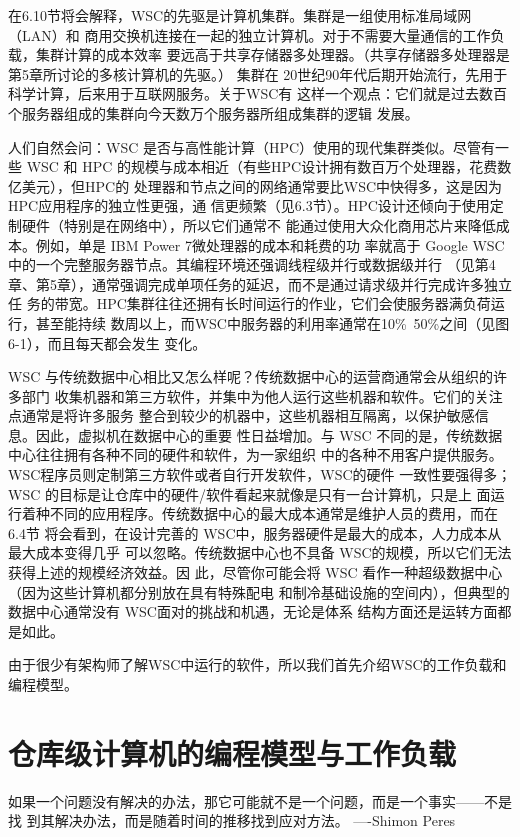 在6.10节将会解释，WSC的先驱是计算机集群。集群是一组使用标准局域网（LAN）和
商用交换机连接在一起的独立计算机。对于不需要大量通信的工作负载，集群计算的成本效率
要远高于共享存储器多处理器。（共享存储器多处理器是第5章所讨论的多核计算机的先驱。）
集群在 20世纪90年代后期开始流行，先用于科学计算，后来用于互联网服务。关于WSC有
这样一个观点：它们就是过去数百个服务器组成的集群向今天数万个服务器所组成集群的逻辑
发展。

人们自然会问：WSC 是否与高性能计算（HPC）使用的现代集群类似。尽管有一些 WSC
和 HPC 的规模与成本相近（有些HPC设计拥有数百万个处理器，花费数亿美元），但HPC的
处理器和节点之间的网络通常要比WSC中快得多，这是因为HPC应用程序的独立性更强，通
信更频繁（见6.3节）。HPC设计还倾向于使用定制硬件（特别是在网络中），所以它们通常不
能通过使用大众化商用芯片来降低成本。例如，单是 IBM Power 7微处理器的成本和耗费的功
率就高于 Google WSC中的一个完整服务器节点。其编程环境还强调线程级并行或数据级并行
（见第4章、第5章），通常强调完成单项任务的延迟，而不是通过请求级并行完成许多独立任
务的带宽。HPC集群往往还拥有长时间运行的作业，它们会使服务器满负荷运行，甚至能持续
数周以上，而WSC中服务器的利用率通常在10\%~50\%之间（见图6-1），而且每天都会发生
变化。

WSC 与传统数据中心相比又怎么样呢？传统数据中心的运营商通常会从组织的许多部门
收集机器和第三方软件，并集中为他人运行这些机器和软件。它们的关注点通常是将许多服务
整合到较少的机器中，这些机器相互隔离，以保护敏感信息。因此，虚拟机在数据中心的重要
性日益增加。与 WSC 不同的是，传统数据中心往往拥有各种不同的硬件和软件，为一家组织
中的各种不用客户提供服务。WSC程序员则定制第三方软件或者自行开发软件，WSC的硬件
一致性要强得多；WSC 的目标是让仓库中的硬件/软件看起来就像是只有一台计算机，只是上
面运行着种不同的应用程序。传统数据中心的最大成本通常是维护人员的费用，而在6.4节
将会看到，在设计完善的 WSC中，服务器硬件是最大的成本，人力成本从最大成本变得几乎
可以忽略。传统数据中心也不具备 WSC的规模，所以它们无法获得上述的规模经济效益。因
此，尽管你可能会将 WSC 看作一种超级数据中心（因为这些计算机都分别放在具有特殊配电
和制冷基础设施的空间内），但典型的数据中心通常没有 WSC面对的挑战和机遇，无论是体系
结构方面还是运转方面都是如此。

由于很少有架构师了解WSC中运行的软件，所以我们首先介绍WSC的工作负载和编程模型。

\section{仓库级计算机的编程模型与工作负载}
如果一个问题没有解决的办法，那它可能就不是一个问题，而是一个事实——不是找
到其解决办法，而是随着时间的推移找到应对方法。
—-Shimon Peres

